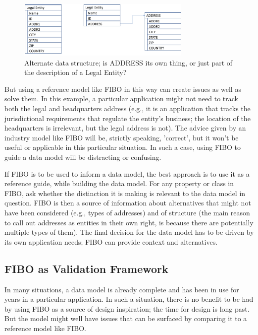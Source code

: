 \begin{figure}[hbt] %
\centering
  \includegraphics[width=3.3in]{figures/data-structure.jpg}
\caption{Alternate data structure; is ADDRESS its own thing, or just part of the description of a Legal Entity? }
\label{ch01.fig1} 
\end{figure}


But using a reference model like FIBO in this way can create issues as well as solve them.  In this example, a particular application might not need to track both the legal and headquarters address (e.g., it is an application that tracks the jurisdictional requirements that regulate the entity's business; the location of the headquarters is irrelevant, but the legal address is not).   The advice given by an industry model like FIBO will be, strictly speaking, 'correct', but it won't be useful or applicable in this particular situation.  In such a case, using FIBO to guide a data model will be distracting or confusing. 

If FIBO is to be used to inform a data model, the best approach is to use it as a reference guide, while building the data model.  For any property or class in FIBO, ask whether the distinction it is making is relevant to the data model in question.  FIBO is then a source of information about alternatives that might not have been considered (e.g., types of addresses) and of structure (the main reason to call out addresses as entities in their own right, is because there are potentially multiple types of them).  The final decision for the data model has to be driven by its own application needs; FIBO can provide context and alternatives. 

\subsection{FIBO as Validation Framework}

In many situations, a data model is already complete and has been in use for years in a particular application.  In such a situation, there is no benefit to be had by using FIBO as a source of design inspiration; the time for design is long past.  But the model might well have issues that can be surfaced by comparing it to a reference model like FIBO. 


